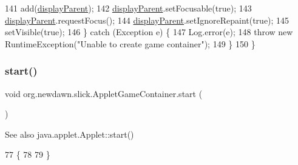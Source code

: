 \begin{DoxyCode}
141          add(\mbox{\hyperlink{classorg_1_1newdawn_1_1slick_1_1_applet_game_container_a62b5a90dcfc53b23717ea63133f86332}{displayParent}});
142          \mbox{\hyperlink{classorg_1_1newdawn_1_1slick_1_1_applet_game_container_a62b5a90dcfc53b23717ea63133f86332}{displayParent}}.setFocusable(\textcolor{keyword}{true});
143          \mbox{\hyperlink{classorg_1_1newdawn_1_1slick_1_1_applet_game_container_a62b5a90dcfc53b23717ea63133f86332}{displayParent}}.requestFocus();
144          \mbox{\hyperlink{classorg_1_1newdawn_1_1slick_1_1_applet_game_container_a62b5a90dcfc53b23717ea63133f86332}{displayParent}}.setIgnoreRepaint(\textcolor{keyword}{true});
145          setVisible(\textcolor{keyword}{true});
146       \} \textcolor{keywordflow}{catch} (Exception e) \{
147          Log.error(e);
148          \textcolor{keywordflow}{throw} \textcolor{keyword}{new} RuntimeException(\textcolor{stringliteral}{"Unable to create game container"});
149       \}
150    \}
\end{DoxyCode}
\mbox{\label{classorg_1_1newdawn_1_1slick_1_1_applet_game_container_a4eaf8c9a006d8877050863c07da85c3f}} 
\subsubsection{\texorpdfstring{start()}{start()}}
{\footnotesize\ttfamily void org.\+newdawn.\+slick.\+Applet\+Game\+Container.\+start (\begin{DoxyParamCaption}{ }\end{DoxyParamCaption})\hspace{0.3cm}{\ttfamily [inline]}}

\begin{DoxySeeAlso}{See also}
java.\+applet.\+Applet\+::start() 
\end{DoxySeeAlso}

\begin{DoxyCode}
77                        \{
78       
79    \}
\end{DoxyCode}
\mbox{\label{classorg_1_1newdawn_1_1slick_1_1_applet_game_container_af95e36a2d15fa8475f93483776eb2fe3}} 
